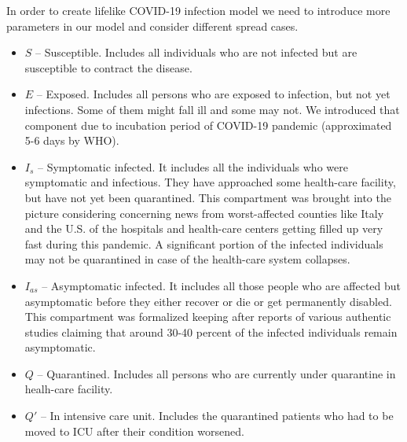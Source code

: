 \documentclass[12pt, a4paper]{article}
\begin{document}
	In order to create lifelike COVID-19 infection model we need to introduce more parameters in our model and consider different spread cases.
	\begin{itemize}
		\item \textbf{$S$} -- Susceptible. Includes all individuals who are not infected but are susceptible to contract the disease.
		\item \textbf{$E$} -- Exposed. Includes all persons who are exposed to infection, but not yet infections. Some of them might fall ill and some may not. We introduced that component due to incubation period of COVID-19 pandemic (approximated 5-6 days by WHO).
		\item \textbf{$I_s$} -- Symptomatic infected. It includes all the individuals who were symptomatic and infectious. They have approached some health-care facility, but have not yet been quarantined. This compartment was brought into the picture considering concerning news from worst-affected counties like Italy and the U.S. of the hospitals and health-care centers getting filled up very fast during this pandemic. A significant portion of the infected individuals may not be quarantined in case of the health-care system collapses.
		\item \textbf{$I_{as}$} -- Asymptomatic infected. It includes all those people who are affected but asymptomatic before they either recover or die or get permanently disabled. This compartment was formalized keeping after reports of various authentic studies claiming that around 30-40 percent of the infected individuals remain
		asymptomatic.
		\item \textbf{$Q$} -- Quarantined. Includes all persons who are currently under quarantine in healh-care facility.
		\item \textbf{$Q'$} -- In intensive care unit. Includes the quarantined patients who had to be moved to ICU after their condition worsened.
		

\end{itemize}
\end{document}
